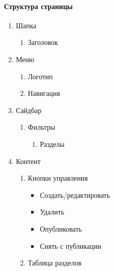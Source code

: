 \paragraph{Структура страницы}
\begin{enumerate}
	\item Шапка
	\begin{enumerate}
		\item Заголовок
	\end{enumerate}

	\item Меню
	\begin{enumerate}
		\item Логотип
		\item Навигация
	\end{enumerate}

	\item Сайдбар
	\begin{enumerate}
		\item Фильтры
		\begin{enumerate}
			\item Разделы
		\end{enumerate}
	\end{enumerate}

	\item Контент
	\begin{enumerate}
		\item Кнопки управления
		\begin{itemize}
			\item Создать/редактировать
			\item Удалить
			\item Опубликовать
			\item Снять с публикации
		\end{itemize}
		\item Таблица разделов
	\end{enumerate}
\end{enumerate}

